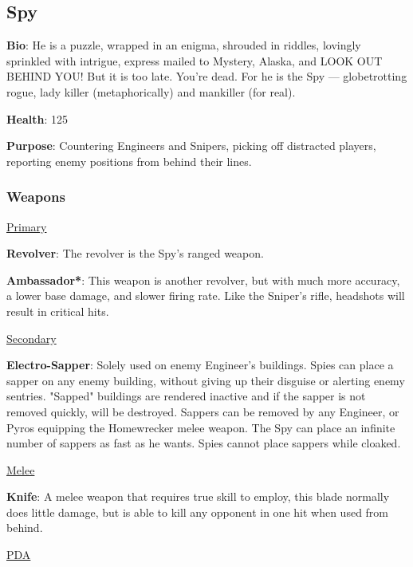 \subsection{Spy}
{\bf Bio}:
He is a puzzle, wrapped in an enigma, shrouded in riddles, lovingly sprinkled with intrigue, express mailed to Mystery, Alaska, and LOOK OUT BEHIND YOU! But it is too late. You're dead. For he is the Spy — globetrotting rogue, lady killer (metaphorically) and mankiller (for real).

{\bf Health}: 125

{\bf Purpose}:
Countering Engineers and Snipers, picking off distracted players, reporting enemy positions from behind their lines.


\subsubsection {Weapons}

\begin {center}
\underline {Primary}
\end {center}

{\bf Revolver}: The revolver is the Spy's ranged weapon.

{\bf Ambassador*}: This weapon is another revolver, but with much more accuracy, a lower base damage, and slower firing rate.  Like the Sniper's rifle, headshots will result in critical hits.

\begin {center}
\underline {Secondary}
\end {center}

{\bf Electro-Sapper}: Solely used on enemy Engineer's buildings. Spies can place a sapper on any enemy building, without giving up their disguise or alerting enemy sentries. "Sapped" buildings are rendered inactive and if the sapper is not removed quickly, will be destroyed. Sappers can be removed by any Engineer, or Pyros equipping the Homewrecker melee weapon. The Spy can place an infinite number of sappers as fast as he wants. Spies cannot place sappers while cloaked.

\begin {center}
\underline {Melee}
\end {center}

{\bf Knife}: A melee weapon that requires true skill to employ, this blade normally does little damage, but is able to kill any opponent in one hit when used from behind.

\newpage

\begin {center}
\underline {PDA}
\end {center}

